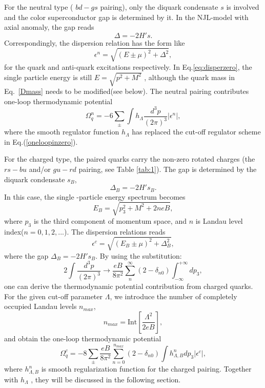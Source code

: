 \documentclass[prd, showpacs,nofootinbib,amsmath,amssymb,12pt]{revtex4}
\begin{document}
For the neutral type ( $bd-gs$ pairing), only the diquark condensate $s$ is involved and the color superconductor gap is determined by it.
In the NJL-model with axial anomaly, the gap reads
\begin{equation}
\Delta=-2H's.
\end{equation}
Correspondingly, the dispersion relation  has the form like 
\begin{equation}
\label{eq:disperzero}
\epsilon^n=\sqrt{(E\pm\mu)^2+\Delta^2},
\end{equation}
for the quark and anti-quark excitations respectively.
In Eq.\eqref{eq:disperzero}, the single particle energy is still $E=\sqrt{p^2+M^2}$ , although the quark mass in Eq.~\eqref{Dmass} needs to be modified(see below).
The neutral pairing contributes one-loop thermodynamic potential
\begin{equation}
\Omega^n_q=-6\sum_{\pm}\int h_{\Lambda}\frac{d^3p}{(2\pi)^3} |\epsilon^n|,
\label{omegaq}
\end{equation}
where the smooth regulator function $h_\Lambda$ has replaced the cut-off regulator scheme in Eq.(\ref{oneloopinzero}).

For the charged type, the paired quarks carry the non-zero rotated charges (the $rs-bu$ and/or $gu-rd$ pairing, see Table \ref{tab:1}).
The gap is determined by the diquark condensate $s_B$,
\begin{equation}
\Delta_B=-2H's_B.
\end{equation}
In this case, the single -particle energy spectrum becomes
\begin{equation}
\label{eq:energyb}
E_B=\sqrt{p^2_3+M^2 + 2neB},
\end{equation}
where $p_3$ is the third component of momentum space, and $n$ is Landau level index($n=0,1,2,...$).
The dispersion relations reads
\begin{equation}
    \epsilon^c=\sqrt{(E_B\pm\mu)^2+\Delta_B^2},
\end{equation}
where the gap $\Delta_B=-2H' s_B$.
By using the substitution:
\begin{equation}
2\int\frac{d^3p}{(2\pi)^3}\rightarrow\frac{eB}{8\pi^2}\sum^{\infty}_n(2-\delta_{n0})\int^{+\infty}_{-\infty} dp_3,
\label{eq:momentumsub}
\end{equation}
one can derive the thermodynamic potential contribution from charged quarks.
For the given cut-off parameter $\Lambda$, we introduce the number of completely occupied Landau levels $n_{max}$, 
\begin{equation}\label{eq:nmax}
  n_{max}= \text{Int}[\frac{\Lambda^2}{2eB}],
\end{equation}
and obtain the one-loop thermodynamic potential 
\begin{equation}
\Omega^c_q=-8\sum_{\pm}\frac{eB}{8\pi^2}\sum_{n=0}^{n_{max}} (2 -\delta_{n0}) \int h^n_{\Lambda,B} dp_3|\epsilon^c|, 
\end{equation}
where $h^n_{\Lambda,B}$ is smooth regularization function for the charged pairing. Together with $h_\Lambda$ , they will be discussed in the following section.
\end{document}

